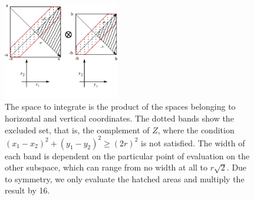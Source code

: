 \documentclass[superscriptaddress,pre,reprint,showpacs,onecolumn]{revtex4-1}
\begin{document}
\begin{figure}[h]
  \begin{center}
    \includegraphics[width=0.45\textwidth]{figures/diagramintegra01.pdf}
  \end{center}
  \caption{The space to integrate is the product of the spaces
    belonging to horizontal and vertical coordinates. The dotted
    bands show the excluded set, that is, the complement of $Z$, where the condition 
    $ (x_1-x_2)^2 + (y_1-y_2)^2 \ge (2r)^2 $ is not satisfied.
    The width of each band is dependent on the particular 
    point of evaluation
    on the other subspace, which can range from no width at
    all to $r\sqrt{2}$.
    Due to 
    symmetry, we only evaluate the hatched areas and multiply
    the result by 16. 
    \label{diagintegral01}  
    }
\end{figure}
\end{document}
